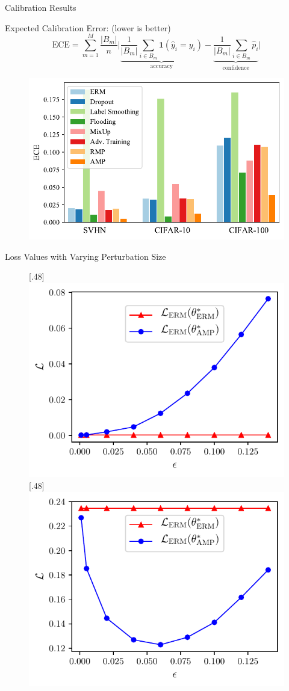 \begin{frame}{Calibration Results}

Expected Calibration Error: (lower is better)
\begin{equation*}
\text{ECE}=\sum_{m=1}^M\frac{|B_m|}{n}\bigg\vert\underbrace{\frac{1}{|B_m|}\sum_{i\in B_m}\mathbf{1}(\hat{y}_i=y_i)}_{\text{accuracy}}-\underbrace{\frac{1}{|B_m|}\sum_{i\in B_m}\hat{p}_i}_{\text{confidence}}\bigg\vert
\end{equation*}

\begin{figure}
\includegraphics[width=.48\textwidth]{figs/ece.pdf}
\end{figure}

\end{frame}

\begin{frame}{Loss Values with Varying Perturbation Size}

\begin{figure}
[.48\textwidth]{\includegraphics[width=.45\textwidth]{figs/tune_a.pdf}}
[.48\textwidth]{\includegraphics[width=.45\textwidth]{figs/tune_b.pdf}}
\end{figure}

\end{frame}


